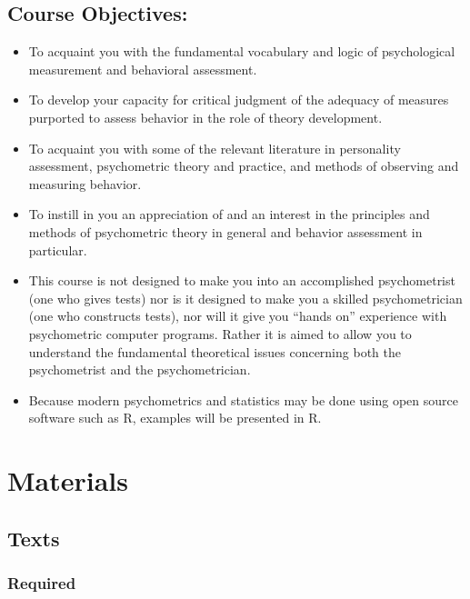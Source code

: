 \documentclass[11pt,]{article}
\providecommand{\tightlist}{%
  \setlength{\itemsep}{0pt}\setlength{\parskip}{0pt}}
\begin{document}
\hypertarget{course-objectives}{%
\subsection{Course Objectives:}\label{course-objectives}}

\begin{itemize}
\tightlist
\item
  To acquaint you with the fundamental vocabulary and logic of
  psychological measurement and behavioral assessment.
\item
  To develop your capacity for critical judgment of the adequacy of
  measures purported to assess behavior in the role of theory
  development.
\item
  To acquaint you with some of the relevant literature in personality
  assessment, psychometric theory and practice, and methods of observing
  and measuring behavior.
\item
  To instill in you an appreciation of and an interest in the principles
  and methods of psychometric theory in general and behavior assessment
  in particular.
\item
  This course is not designed to make you into an accomplished
  psychometrist (one who gives tests) nor is it designed to make you a
  skilled psychometrician (one who constructs tests), nor will it give
  you ``hands on'' experience with psychometric computer programs.
  Rather it is aimed to allow you to understand the fundamental
  theoretical issues concerning both the psychometrist and the
  psychometrician.
\item
  Because modern psychometrics and statistics may be done using open
  source software such as R, examples will be presented in R.
\end{itemize}

\hypertarget{materials}{%
\section{Materials}\label{materials}}

\hypertarget{texts}{%
\subsection{Texts}\label{texts}}

\hypertarget{required}{%
\subsubsection{Required}\label{required}}
\end{document}

